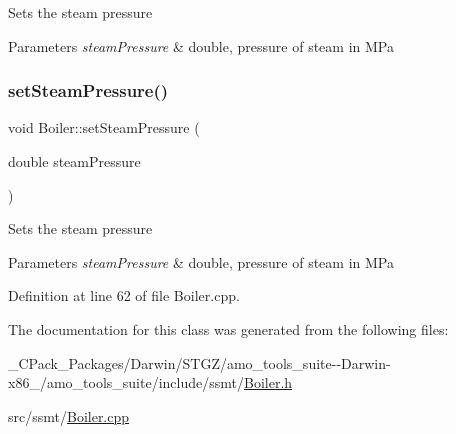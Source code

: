 Sets the steam pressure 
\begin{DoxyParams}{Parameters}
{\em steam\+Pressure} & double, pressure of steam in M\+Pa \\
\hline
\end{DoxyParams}
\mbox{\label{class_boiler_a0a4619ff73c9969daebe3aa66ddad6be}} 
\subsubsection{\texorpdfstring{set\+Steam\+Pressure()}{setSteamPressure()}\hspace{0.1cm}{\footnotesize\ttfamily [3/3]}}
{\footnotesize\ttfamily void Boiler\+::set\+Steam\+Pressure (\begin{DoxyParamCaption}\item[{double}]{steam\+Pressure }\end{DoxyParamCaption})}

Sets the steam pressure 
\begin{DoxyParams}{Parameters}
{\em steam\+Pressure} & double, pressure of steam in M\+Pa \\
\hline
\end{DoxyParams}


Definition at line 62 of file Boiler.\+cpp.



The documentation for this class was generated from the following files\+:\begin{DoxyCompactItemize}
\item 
\+\_\+\+C\+Pack\+\_\+\+Packages/\+Darwin/\+S\+T\+G\+Z/amo\+\_\+tools\+\_\+suite-\/-\/\+Darwin-\/x86\+\_/amo\+\_\+tools\+\_\+suite/include/ssmt/\hyperlink{___c_pack___packages_2_darwin_2_s_t_g_z_2amo__tools__suite--_darwin-x86__64_2amo__tools__suite_2include_2ssmt_2_boiler_8h}{Boiler.\+h}\item 
src/ssmt/\hyperlink{_boiler_8cpp}{Boiler.\+cpp}\end{DoxyCompactItemize}
